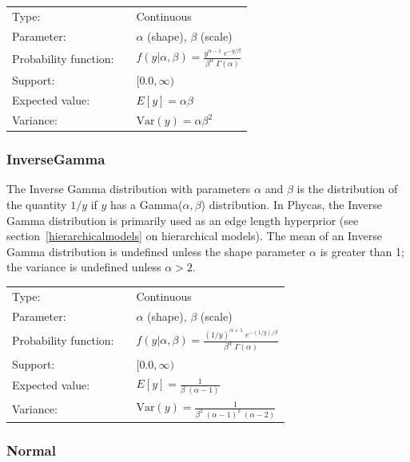 \documentclass[10pt]{article}
\newcommand{\Var}{\mbox{Var}}
\begin{document}
\begin{tabular}{lcl}
Type:                 & & Continuous \\
Parameter:            & & $\alpha$ (shape), $\beta$ (scale)    \\
Probability function: & & $f(y|\alpha,\beta) = \frac{y^{\alpha - 1} \; e^{-y/\beta}}{\beta^{\alpha} \; \Gamma(\alpha)}$ \\
Support:              & & $[0.0,\infty)$     \\
Expected value:       & & $E[y] = \alpha \beta$ \\
Variance:             & & $\Var(y) = \alpha \beta^2$ 
\end{tabular}

\subsubsection{InverseGamma}\label{inversegammadist}

The Inverse Gamma distribution with parameters $\alpha$ and $\beta$ is the distribution of the quantity $1/y$ if $y$ has a Gamma($\alpha,\beta$) distribution. In Phycas, the Inverse Gamma distribution is primarily used as an edge length hyperprior (see section~\ref{hierarchicalmodels} on hierarchical models). The mean of an Inverse Gamma distribution is undefined unless the shape parameter $\alpha$ is greater than 1; the variance is undefined unless $\alpha > 2$.

\begin{tabular}{lcl}
Type:                 & & Continuous \\
Parameter:            & & $\alpha$ (shape), $\beta$ (scale)    \\
Probability function: & & $f(y|\alpha,\beta) = \frac{(1/y)^{\alpha + 1} \; e^{-(1/y)/\beta}}{\beta^{\alpha} \; \Gamma(\alpha)}$ \\
Support:              & & $[0.0,\infty)$     \\
Expected value:       & & $E[y] = \frac{1}{\beta \;(\alpha-1)}$ \\
Variance:             & & $\Var(y) = \frac{1}{\beta^2 \; (\alpha-1)^2 \; (\alpha-2)}$ 
\end{tabular}

\subsubsection{Normal}\label{normaldist}
\end{document}
